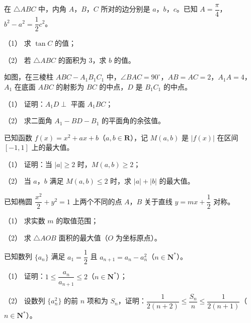 \begin{question}
在 \(\triangle ABC\) 中，内角 \(A\)，\(B\)，\(C\) 所对的边分别是 \(a\)，\(b\)，\(c\)。已知 \(A=\dfrac{\pi}{4}\)，\(b^2-a^2=\dfrac12c^2\)。

（1） 求 \(\tan C\) 的值；

（2） 若 \(\triangle ABC\) 的面积为 \(3\)，求 \(b\) 的值。

\Needspace{0.4\textheight}
\end{question}
\begin{question}
如图，在三棱柱 \(ABC-A_1B_1C_1\) 中，\(\angle BAC=90^\circ\)，\(AB=AC=2\)，\(A_1A=4\)，\(A_1\) 在底面 \(ABC\) 的射影为 \(BC\) 的中点，\(D\) 是 \(B_1C_1\) 的中点。

（1） 证明：\(A_1D\perp\) 平面 \(A_1BC\)；

（2） 求二面角 \(A_1-BD-B_1\) 的平面角的余弦值。
\nopagebreak[4]
\begin{center}\end{center}
\nopagebreak[4]
\end{question}
\begin{question}
 已知函数 \(f(x)=x^2+ax+b\)（\(a,b\in\mathbf{R}\)），记 \(M(a,b)\) 是 \(|f(x)|\) 在区间 \([-1,1]\) 上的最大值。

（1） 证明：当 \(|a|\geqslant2\) 时，\(M(a,b)\geqslant2\)；

（2） 当 \(a\)，\(b\) 满足 \(M(a,b)\leqslant2\) 时，求 \(|a|+|b|\) 的最大值。

\Needspace{0.4\textheight}
\end{question}
\begin{question}
已知椭圆 \(\dfrac{x^2}{2}+y^2=1\) 上两个不同的点 \(A\)，\(B\) 关于直线 \(y=mx+\dfrac12\) 对称。

（1） 求实数 \(m\) 的取值范围；

（2） 求 \(\triangle AOB\) 面积的最大值（\(O\) 为坐标原点）。
\nopagebreak[4]
\begin{center}\end{center}
\nopagebreak[4]
\end{question}
\begin{question}
已知数列 \(\{a_n\}\) 满足 \(a_1=\dfrac12\) 且 \(a_{n+1}=a_n-a_n^2\)（\(n\in\mathbf{N}^*\)）。

（1） 证明：\(1\leqslant\dfrac{a_n}{a_{n+1}}\leqslant2\)（\(n\in\mathbf{N}^*\)）；

（2） 设数列 \(\{a_n^2\}\) 的前 \(n\) 项和为 \(S_n\)，证明：\(\dfrac{1}{2(n+2)}\leqslant\dfrac{S_n}{n}\leqslant\dfrac{1}{2(n+1)}\)（\(n\in\mathbf{N}^*\)）。

\end{question}